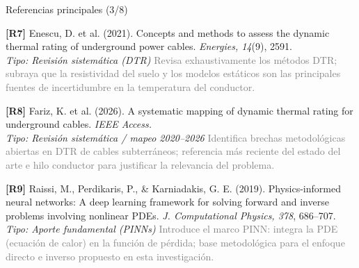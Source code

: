 \documentclass[aspectratio=169]{beamer}
\begin{document}
\begin{frame}{Referencias principales (3/8)}
\small\justifying

\textbf{[R7]} Enescu, D. et al. (2021). Concepts and methods to assess the
dynamic thermal rating of underground power cables. \textit{Energies,
14}(9), 2591.\\
\textcolor{blue!60!black}{\footnotesize\textit{Tipo: Revisión sistemática (DTR)}} \quad
\textcolor{gray}{\footnotesize Revisa exhaustivamente los métodos DTR; subraya
que la resistividad del suelo y los modelos estáticos son las principales
fuentes de incertidumbre en la temperatura del conductor.}

\medskip
\textbf{[R8]} Fariz, K. et al. (2026). A systematic mapping of dynamic thermal
rating for underground cables. \textit{IEEE Access.}\\
\textcolor{blue!60!black}{\footnotesize\textit{Tipo: Revisión sistemática / mapeo 2020--2026}} \quad
\textcolor{gray}{\footnotesize Identifica brechas metodológicas abiertas en DTR
de cables subterráneos; referencia más reciente del estado del arte e hilo
conductor para justificar la relevancia del problema.}

\medskip
\textbf{[R9]} Raissi, M., Perdikaris, P., \& Karniadakis, G. E. (2019).
Physics-informed neural networks: A deep learning framework for solving forward
and inverse problems involving nonlinear PDEs. \textit{J. Computational
Physics, 378}, 686--707.\\
\textcolor{blue!60!black}{\footnotesize\textit{Tipo: Aporte fundamental (PINNs)}} \quad
\textcolor{gray}{\footnotesize Introduce el marco PINN: integra la PDE (ecuación
de calor) en la función de pérdida; base metodológica para el enfoque directo
e inverso propuesto en esta investigación.}
\end{frame}
\end{document}
